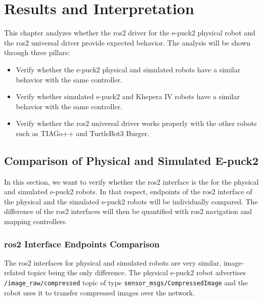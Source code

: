 \chapter{Results and Interpretation}
\label{chap:results}

This chapter analyzes whether the \ac{ros2} driver for the e-puck2 physical robot and the \ac{ros2} universal driver provide expected behavior. The analysis will be shown through three pillars:
\begin{itemize}
    \item Verify whether the e-puck2 physical and simulated robots have a similar behavior with the same controller.
    \item Verify whether simulated e-puck2 and Khepera IV robots have a similar behavior with the same controller.
    \item Verify whether the \ac{ros2} universal driver works properly with the other robots such as TIAGo++ and TurtleBot3 Burger.
\end{itemize}


\section{Comparison of Physical and Simulated E-puck2}

In this section, we want to verify whether the \ac{ros2} interface is the for the physical and simulated e-puck2 robots.
In that respect, endpoints of the \ac{ros2} interface of the physical and the simulated e-puck2 robots will be individually compared.
The difference of the \ac{ros2} interfaces will then be quantified with \ac{ros2} navigation and mapping controllers.

\subsection{\ac{ros2} Interface Endpoints Comparison}

The \ac{ros2} interfaces for physical and simulated robots are very similar, image-related topics being the only difference.
The physical e-puck2 robot advertises \texttt{/image\_raw/compressed} topic of type \texttt{sensor\_msgs/CompressedImage} and the robot uses it to transfer compressed images over the network.

